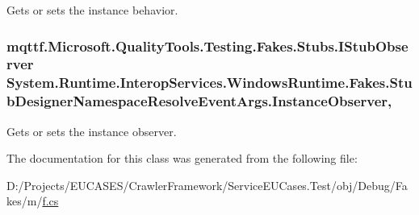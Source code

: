 Gets or sets the instance behavior.

\hypertarget{class_system_1_1_runtime_1_1_interop_services_1_1_windows_runtime_1_1_fakes_1_1_stub_designer_namespace_resolve_event_args_a213955f251da26130483f9d5301df077}{
\subsubsection[{Instance\-Observer}]{\setlength{\rightskip}{0pt plus 5cm}mqttf.\-Microsoft.\-Quality\-Tools.\-Testing.\-Fakes.\-Stubs.\-I\-Stub\-Observer System.\-Runtime.\-Interop\-Services.\-Windows\-Runtime.\-Fakes.\-Stub\-Designer\-Namespace\-Resolve\-Event\-Args.\-Instance\-Observer\hspace{0.3cm}{\ttfamily [get]}, {\ttfamily [set]}}}\label{class_system_1_1_runtime_1_1_interop_services_1_1_windows_runtime_1_1_fakes_1_1_stub_designer_namespace_resolve_event_args_a213955f251da26130483f9d5301df077}


Gets or sets the instance observer.



The documentation for this class was generated from the following file\-:\begin{DoxyCompactItemize}
\item 
D\-:/\-Projects/\-E\-U\-C\-A\-S\-E\-S/\-Crawler\-Framework/\-Service\-E\-U\-Cases.\-Test/obj/\-Debug/\-Fakes/m/\hyperlink{m_2f_8cs}{f.\-cs}\end{DoxyCompactItemize}
